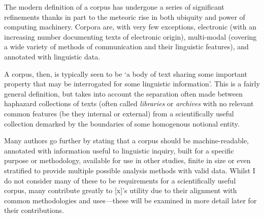 The modern definition of a corpus has undergone a series of significant refinements thanks in part to the meteoric rise in both ubiquity and power of computing machinery.  Corpora are, with very few exceptions, electronic (with an increasing number documenting texts of electronic origin), multi-modal (covering a wide variety of methods of communication and their linguistic features), and annotated with linguistic data.  


A corpus, then, is typically seen to be `a body of text sharing some important property that may be interrogated for some linguistic information'.  This is a fairly general definition, but takes into account the separation often made between haphazard collections of texts (often called \textsl{libraries} or \textsl{archives} with no relevant common features (be they internal or external) from a scientifically useful collection demarked by the boundaries of some homogenous notional entity.

Many authors %
go further by stating that a corpus should be machine-readable, annotated with information useful to linguistic inquiry, built for a specific purpose or methodology, available for use in other studies, finite in size or even stratified to provide multiple possible analysis methods with valid data.  Whilst I do not consider many of these to be requirements for a scientifically useful corpus, many contribute greatly to [x]'s utility due to their alignment with common methodologies and uses---these will be examined in more detail later for their contributions.








